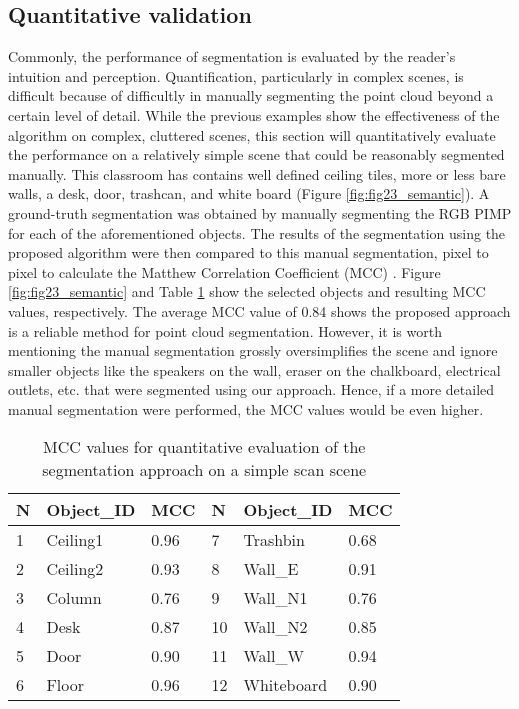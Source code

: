 \documentclass[final,3p,times,twocolumn,authoryear]{elsarticle}
\begin{document}
\subsection{Quantitative validation}

Commonly, the performance of segmentation is evaluated by the reader's intuition and perception. Quantification, particularly in complex scenes, is difficult because of difficultly  in manually segmenting the point cloud beyond a certain level of detail. While the previous examples show the effectiveness of the algorithm on complex, cluttered scenes, this section will quantitatively evaluate the performance on a relatively simple scene that could be reasonably segmented manually.  This classroom has contains well defined ceiling tiles, more or less bare walls, a desk, door, trashcan, and white board (Figure \ref{fig:fig23_semantic}).
A ground-truth segmentation was obtained by manually segmenting the RGB PIMP for each of the aforementioned objects. The results of the segmentation using the proposed algorithm were then compared to this manual segmentation, pixel to pixel to calculate the Matthew Correlation Coefficient (MCC) \cite{powers2011}. Figure \ref{fig:fig23_semantic} and Table \ref{segMCC} show the selected objects and resulting MCC values, respectively.
The average MCC value of 0.84 shows the proposed approach is a reliable method for point cloud segmentation. However, it is worth mentioning the manual segmentation grossly oversimplifies the scene and ignore smaller objects like the speakers on the wall, eraser on the chalkboard, electrical outlets, etc. that were segmented using our approach.  Hence, if a more detailed manual segmentation were performed, the MCC values would be even higher.  

\begin{table}[h]
	\centering
	\caption{MCC values for quantitative evaluation of the segmentation approach on a simple scan scene}
	\label{segMCC}
	\begin{tabular}{lll|lll}
		N & Object\_ID & MCC  & N  & Object\_ID & MCC  \\
		\hline
		1 & Ceiling1   & 0.96 & 7  & Trashbin   & 0.68 \\
		2 & Ceiling2   & 0.93 & 8  & Wall\_E    & 0.91 \\
		3 & Column     & 0.76 & 9  & Wall\_N1   & 0.76 \\
		4 & Desk       & 0.87 & 10 & Wall\_N2   & 0.85 \\
		5 & Door       & 0.90 & 11 & Wall\_W    & 0.94 \\
		6 & Floor      & 0.96 & 12 & Whiteboard & 0.90
	\end{tabular}
\end{table}
\end{document}
